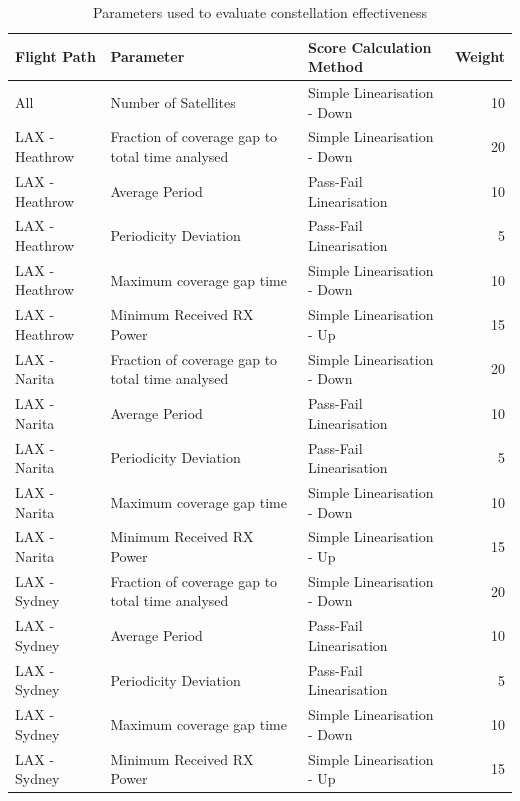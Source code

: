 \begin{table}[htbp]
  \centering
  \caption{Parameters used to evaluate constellation effectiveness}
    \begin{tabular}{lp{5cm}p{6cm}r}
    \toprule
    Flight Path & Parameter & Score Calculation Method & Weight \\
    \midrule
    All   & Number of Satellites & Simple Linearisation - Down  & 10\\
    LAX - Heathrow & Fraction of coverage gap to total time analysed & Simple Linearisation - Down & 20 \\
    LAX - Heathrow & Average Period & Pass-Fail Linearisation  & 10\\
    LAX - Heathrow & Periodicity Deviation & Pass-Fail Linearisation & 5 \\
    LAX - Heathrow & Maximum coverage gap time & Simple Linearisation - Down & 10 \\
    LAX - Heathrow & Minimum Received RX Power & Simple Linearisation - Up & 15 \\
    LAX - Narita & Fraction of coverage gap to total time analysed& Simple Linearisation - Down & 20 \\
    LAX - Narita & Average Period & Pass-Fail Linearisation & 10 \\
    LAX - Narita & Periodicity Deviation & Pass-Fail Linearisation & 5  \\
    LAX - Narita & Maximum coverage gap time & Simple Linearisation - Down & 10 \\
    LAX - Narita & Minimum Received RX Power & Simple Linearisation - Up & 15 \\
    LAX - Sydney & Fraction of coverage gap to total time analysed  & Simple Linearisation - Down & 20 \\
    LAX - Sydney & Average Period & Pass-Fail Linearisation & 10\\
    LAX - Sydney & Periodicity Deviation & Pass-Fail Linearisation & 5 \\
    LAX - Sydney & Maximum coverage gap time & Simple Linearisation - Down & 10\\
    LAX - Sydney & Minimum Received RX Power & Simple Linearisation - Up & 15\\
    \bottomrule
    \end{tabular}%
  \label{tab:parameters}%
\end{table}%


